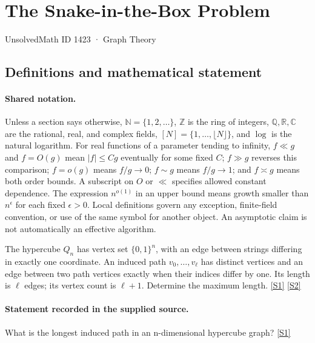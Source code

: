 \documentclass[11pt,a4paper]{article}
\newcommand{\N}{\mathbb{N}}
\newcommand{\Z}{\mathbb{Z}}
\newcommand{\Q}{\mathbb{Q}}
\newcommand{\R}{\mathbb{R}}
\newcommand{\C}{\mathbb{C}}
\newcommand{\sref}[2]{\hyperlink{source:#1:#2}{[S#2]}}
\begin{document}

\setcounter{section}{1422}

\section{The Snake-in-the-Box Problem}\label{1423}

{\small\sffamily UnsolvedMath ID 1423 · Graph Theory}

\subsection{Definitions and mathematical statement}

\paragraph{Shared notation.}Unless a section says otherwise, $\N=\{1,2,\ldots\}$,
$\Z$ is the ring of integers, $\Q,\R,\C$ are the rational, real, and complex
fields, $[N]=\{1,\ldots,\lfloor N\rfloor\}$, and $\log$ is the natural
logarithm. For real functions of a parameter tending to infinity,
$f\ll g$ and $f=O(g)$ mean $|f|\leq Cg$ eventually for some fixed $C$;
$f\gg g$ reverses this comparison; $f=o(g)$ means $f/g\to0$;
$f\sim g$ means $f/g\to1$; and $f\asymp g$ means both order bounds.
A subscript on $O$ or $\ll$ specifies allowed constant dependence.
The expression $n^{o(1)}$ in an upper bound means growth smaller than
$n^\epsilon$ for each fixed $\epsilon>0$. Local definitions govern any
exception, finite-field convention, or use of the same symbol for another
object. An asymptotic claim is not automatically an effective algorithm.



The hypercube $Q_n$ has vertex set $\{0,1\}^n$, with an edge between strings differing in exactly one coordinate. An induced path $v_0,\ldots,v_\ell$ has distinct vertices and an edge between two path vertices exactly when their indices differ by one. Its length is $\ell$ edges; its vertex count is $\ell+1$. Determine the maximum length. \sref{1423}{1} \sref{1423}{2}

\paragraph{Statement recorded in the supplied source.}
What is the longest induced path in an n-dimensional hypercube graph? \sref{1423}{1}
\end{document}
